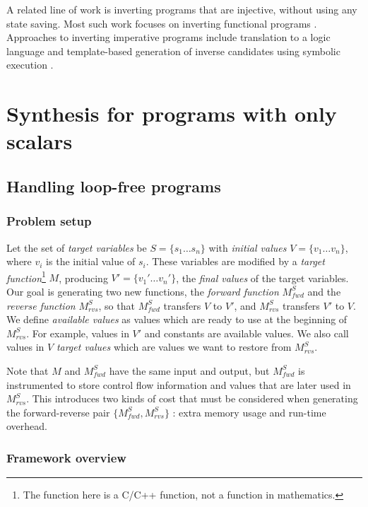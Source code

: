 \documentclass[12pt]{gatech-thesis}
\begin{document}
A related line of work is inverting programs that are injective, without using any state saving.
Most such work focuses on inverting functional programs \cite{Abramov2002a,Gluck2005,Kawabe2005}.
Approaches to inverting imperative programs include translation to a logic language \cite{Ross1997} and template-based generation of inverse candidates using symbolic execution \cite{Srivastava2011}.




\chapter{Synthesis for programs with only scalars}




\section{Handling loop-free programs}


\subsection{Problem setup}
Let the set of \emph{target variables} be $S=\{s_1\dots s_n\}$ with \emph{initial values} $V=\{v_1 \dots v_n\}$, where $v_i$ is the initial value of $s_i$. These variables are modified by a \emph{target function}\footnote{The function here is a C/C++ function, not a function in mathematics.} $M$, producing $V' =\{v_1' \dots v_n'\}$, the \emph{final values} of the target variables. Our goal is generating two new functions, the \emph{forward function} $M^S_{fwd}$ and the \emph{reverse function} $M^S_{rvs}$, so that $M^S_{fwd}$ transfers $V$ to $V'$, and $M^S_{rvs}$ transfers $V'$ to $V$. We define \emph{available values} as values which are ready to use at the beginning of $M^S_{rvs}$. For example, values in $V'$ and constants are available values. We also call values in $V$ \emph{target values} which are values we want to restore from $M^S_{rvs}$.


Note that $M$ and $M^S_{fwd}$ have the same input and output, but $M^S_{fwd}$ is instrumented to store control flow information and values that are later used in $M^S_{rvs}$. 
This introduces two kinds of cost that must be considered when generating the forward-reverse pair $\{M^S_{fwd}, M^S_{rvs}\}$ : 
extra memory usage and run-time overhead.  


\subsection{Framework overview}
\end{document}
